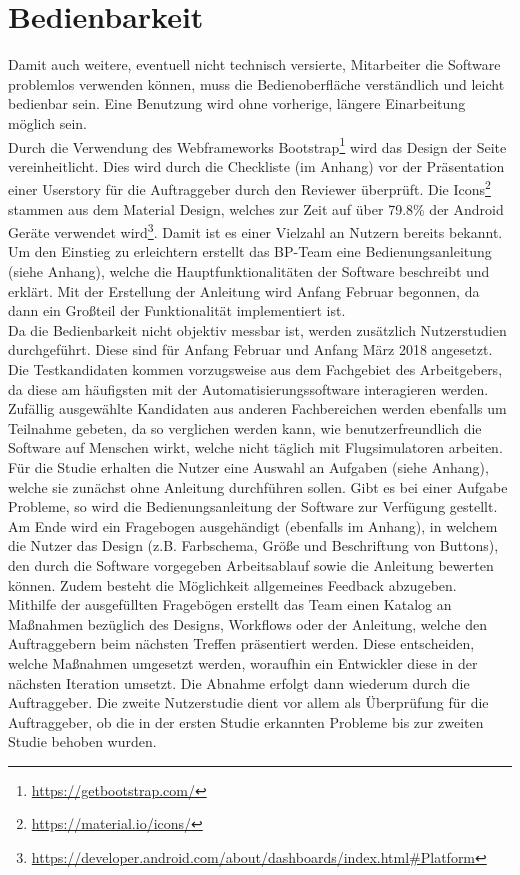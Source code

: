 \documentclass[accentcolor=tud9c,12pt,paper=a4]{tudreport}
\begin{document}
		\section{Bedienbarkeit}\label{bedienbarkeit_qs}
		Damit auch weitere, eventuell nicht technisch versierte, Mitarbeiter die Software
		problemlos verwenden können, muss die
		Bedienoberfläche verständlich und leicht bedienbar sein. Eine Benutzung wird ohne
		vorherige, längere Einarbeitung möglich sein.
		\\[5pt]
		Durch die Verwendung des Webframeworks Bootstrap\footnote{\url{https://getbootstrap.com/}}
		wird das Design der Seite vereinheitlicht. Dies wird durch die Checkliste (im Anhang)
		vor der Präsentation einer Userstory für die Auftraggeber durch den Reviewer überprüft.
		Die Icons\footnote{\url{https://material.io/icons/}}
		stammen aus dem Material Design, welches zur Zeit auf über 79.8\% der Android Geräte
		verwendet wird\footnote{\url{https://developer.android.com/about/dashboards/index.html\#Platform}}.
		Damit ist es einer Vielzahl an Nutzern bereits bekannt.
		\\[5pt]
		Um den Einstieg zu erleichtern erstellt das BP-Team eine Bedienungsanleitung (siehe Anhang),
		welche die Hauptfunktionalitäten der Software beschreibt und erklärt. Mit der Erstellung
		der Anleitung wird Anfang Februar begonnen, da dann ein Großteil der Funktionalität
		implementiert ist.
		\\[5pt]
		Da die Bedienbarkeit nicht objektiv messbar ist, werden zusätzlich Nutzerstudien durchgeführt.
		Diese sind für Anfang Februar und Anfang März 2018 angesetzt.
		Die Testkandidaten kommen vorzugsweise aus dem
		Fachgebiet des Arbeitgebers, da diese am häufigsten mit der Automatisierungssoftware interagieren werden.
		Zufällig ausgewählte Kandidaten aus anderen Fachbereichen werden ebenfalls um Teilnahme gebeten, da
		so verglichen werden kann, wie benutzerfreundlich die Software auf Menschen wirkt, welche nicht täglich
		mit Flugsimulatoren arbeiten.
		\\[5pt]
		Für die Studie erhalten die Nutzer eine Auswahl an Aufgaben (siehe Anhang),
		welche sie zunächst ohne Anleitung durchführen sollen.
		Gibt es bei einer Aufgabe Probleme, so wird die Bedienungsanleitung
		der Software zur Verfügung gestellt.
		Am Ende wird ein Fragebogen ausgehändigt (ebenfalls im Anhang),
		in welchem die Nutzer das Design (z.B. Farbschema, Größe und Beschriftung von Buttons), den
		durch die Software vorgegeben Arbeitsablauf sowie die Anleitung bewerten können. Zudem
		besteht die Möglichkeit allgemeines Feedback abzugeben.
		\\[5pt]
		Mithilfe der ausgefüllten Fragebögen erstellt das Team einen Katalog an
		Maßnahmen bezüglich des Designs, Workflows oder der Anleitung,
		welche den Auftraggebern beim nächsten Treffen präsentiert werden.
		Diese entscheiden, welche Maßnahmen umgesetzt werden, woraufhin ein
		Entwickler diese in der nächsten Iteration umsetzt. Die Abnahme erfolgt dann
		wiederum durch die Auftraggeber.
		Die zweite Nutzerstudie dient vor allem als Überprüfung für die Auftraggeber, ob die
		in der ersten Studie erkannten Probleme bis zur zweiten Studie behoben wurden.
\end{document}
